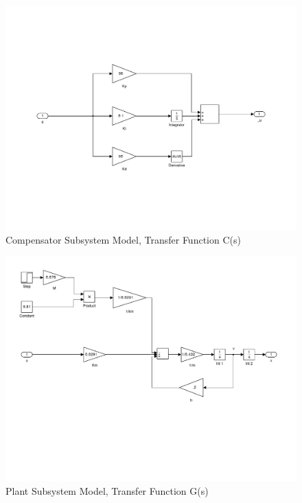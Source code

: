 \documentclass{article}
\begin{document}
{\pagebreak

\begin{figure}[h]
\includegraphics[width=14cm]{Compensator.pdf}
\caption{Compensator Subsystem Model, Transfer Function C(s)}
\end{figure}

\pagebreak

\begin{figure}[h]
\includegraphics[width=14cm]{PlantSystem.pdf}
\caption{Plant Subsystem Model, Transfer Function G(s)}
\end{figure}

\pagebreak

}
\end{document}
